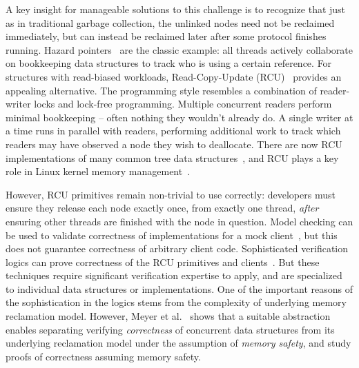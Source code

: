 A key insight for manageable solutions to this challenge is to recognize that just as in traditional garbage collection, the unlinked nodes need not be reclaimed immediately, but can instead be reclaimed later after some protocol finishes running.
Hazard pointers~\cite{Michael:2004:HPS:987524.987595} are the classic example: all threads actively collaborate on bookkeeping data structures to track who is using a certain reference.
For structures with read-biased workloads, Read-Copy-Update (RCU)~\cite{Mckenney:2004:EDD:1048173} provides an appealing alternative. The programming style resembles a combination of reader-writer locks and lock-free programming. 
Multiple concurrent readers perform minimal bookkeeping -- often nothing they wouldn't already do.  A single writer at a time runs in parallel with readers, performing additional work to track which readers may have observed a node they wish to deallocate.
There are now RCU implementations of many common tree data structures~\cite{urcu_ieee,Triplett:2011:RSC:2002181.2002192,DBLP:conf/asplos/ClementsKZ12,mc_report,Arbel:2014:CUR:2611462.2611471,Kung:1980:CMB:320613.320619}, and
RCU plays a key role in Linux kernel memory management~\cite{Mckenney01read-copyupdate}.

However, RCU primitives remain non-trivial to use correctly: developers must ensure they release each node exactly once, from exactly one thread, \emph{after} ensuring other threads are finished with the node in question.
Model checking can be used to validate correctness of implementations for a mock client~\cite{LiangMKM16,Desnoyers:2013:MSM:2506164.2506174,Kokologiannakis:2017:SMC:3092282.3092287,DBLP:conf/cav/AlglaveKT13}, but this does not guarantee correctness of arbitrary client code.
Sophisticated verification logics can prove correctness of the RCU primitives and clients~\cite{Gotsman:2013:VCM:2450268.2450289,fu2010reasoning,verrcu,Mandrykin:2016:TDV:3001219.3001297}.
But these techniques require significant verification expertise to apply, and are specialized to individual data structures or implementations.
One of the important reasons of the sophistication in the logics stems from the complexity of underlying memory reclamation model. However, Meyer et al.~\cite{myr} shows that a suitable abstraction enables separating verifying \textit{correctness} of concurrent data structures from its underlying reclamation model under the assumption of \textit{memory safety}, and study proofs of correctness assuming memory safety.

